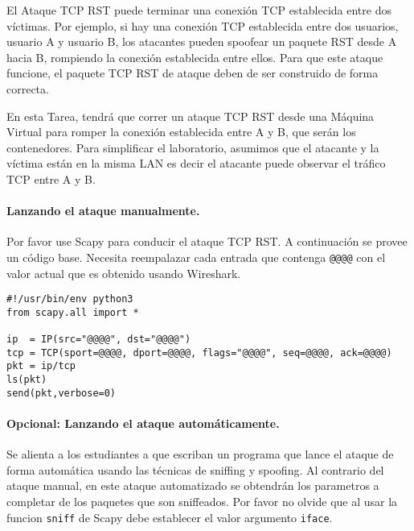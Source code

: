 El Ataque TCP RST puede terminar una conexión TCP establecida entre dos víctimas. Por ejemplo, si hay una conexión TCP \telnet establecida entre dos usuarios, usuario A y usuario B, los atacantes pueden spoofear un paquete RST desde A hacia B, rompiendo la conexión establecida entre ellos. Para que este ataque funcione, el paquete TCP RST de ataque deben de ser construido de forma correcta.

En esta Tarea, tendrá que correr un ataque TCP RST desde una Máquina Virtual para romper la conexión \telnet establecida entre A y B, que serán los contenedores. Para simplificar el laboratorio, asumimos que el atacante y la víctima están en la misma LAN es decir el atacante puede observar el tráfico TCP entre A y B.


\paragraph{Lanzando el ataque manualmente.} 
Por favor use Scapy para conducir el ataque TCP RST.
A continuación se provee un código base. Necesita reempalazar cada entrada que contenga \texttt{@@@@} con el valor actual que es obtenido usando Wireshark.

\begin{lstlisting}
#!/usr/bin/env python3
from scapy.all import *

ip  = IP(src="@@@@", dst="@@@@")
tcp = TCP(sport=@@@@, dport=@@@@, flags="@@@@", seq=@@@@, ack=@@@@)
pkt = ip/tcp
ls(pkt)
send(pkt,verbose=0)
\end{lstlisting}

\paragraph{Opcional: Lanzando el ataque automáticamente.} 
Se alienta a los estudiantes a que escriban un programa que lance el ataque de forma automática usando las técnicas de sniffing y spoofing. Al contrario del ataque manual, en este ataque automatizado se obtendrán los parametros a completar de los paquetes que son sniffeados.
Por favor no olvide que al usar la funcion \texttt{sniff} de Scapy debe establecer el valor argumento \texttt{iface}.

 

